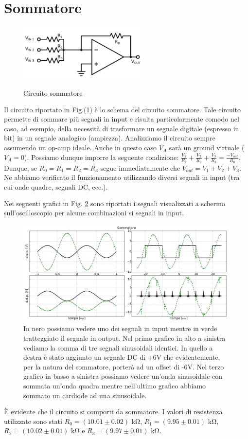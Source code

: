 \section{Sommatore}

\begin{figure}
	\caption{Circuito sommatore}
	\includegraphics[width=65mm]{ccsum.pdf}
	\label{fig:ccsum}
\end{figure}

Il circuito riportato in Fig.(\ref{fig:ccsum}) è lo schema del circuito sommatore.
Tale circuito permette di sommare più segnali in input e risulta particolarmente comodo nel caso, ad esempio, della necessità di trasformare un segnale digitale (espresso in bit) in un segnale analogico (ampiezza).
Analizziamo il circuito sempre assumendo un op-amp ideale.
Anche in questo caso $V_A$ sarà un ground virtuale ($V_A = 0$).
Possiamo dunque imporre la seguente condizione: $\frac{V_1}{R_1}+\frac{V_2}{R_2}+\frac{V_3}{R_3}=\frac{-V_{out}}{R_0}$.
Dunque, se $R_0=R_1=R_2=R_3$ segue immediatamente che $V_{out}=V_1+V_2+V_3$.
Ne abbiamo verificato il funzionamento utilizzando diversi segnali in input (tra cui onde quadre, segnali DC, ecc.).

Nei seguenti grafici in Fig. \ref{fig:sum} sono riportati i segnali visualizzati a schermo sull'oscilloscopio per alcune combinazioni si segnali in input.

\begin{figure}[h]
	\centering
			\includegraphics[width=.9\textwidth]{sum_serie_05.pdf}
			\caption{In nero possiamo vedere uno dei segnali in input mentre in verde tratteggiato il segnale in output. Nel primo grafico in alto a sinistra vediamo la somma di tre segnali sinusoidali identici. In quello a destra è stato aggiunto un segnale DC di +6V che evidentemente, per la natura del sommatore, porterà ad un offset di -6V. Nel terzo grafico in basso a sinistra possiamo vedere un'onda sinusoidale con sommata un'onda quadra mentre nell'ultimo grafico abbiamo sommato un cardiode ad una sinusoidale.}
			\label{fig:sum}
\end{figure}

È evidente che il circuito si comporti da sommatore. I valori di resistenza utilizzate sono stati $R_0=(10.01\pm0.02)$ \si{\kilo\ohm}, $R_1=(9.95\pm0.01)$ \si{\kilo\ohm}, $R_2=(10.02\pm 0.01)$ \si{\kilo\ohm} e $R_3=(9.97\pm0.01)$ \si{\kilo\ohm}. \phantom{xxxxxxxxxxxxxxxxxxxxxxxxxxxxxxxxxxxxxxxx}
